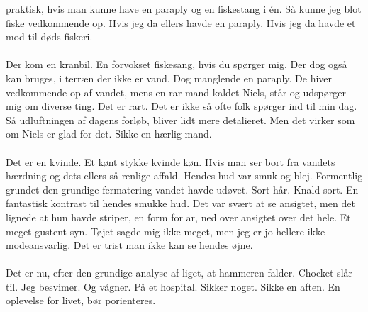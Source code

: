 \documentclass[]{article}
\begin{document}
praktisk, hvis man kunne have en paraply og en fiskestang i én. Så kunne jeg
blot fiske vedkommende op. Hvis jeg da ellers havde en paraply. Hvis jeg da
havde et mod til døds fiskeri.
\\
\\
Der kom en kranbil. En forvokset fiskesang, hvis du spørger mig. Der dog også
kan bruges, i terræn der ikke er vand. Dog manglende en paraply. De hiver
vedkommende op af vandet, mens en rar mand kaldet Niels, står og udspørger mig om diverse ting. Det er rart. Det er ikke så ofte folk spørger ind til min dag.
Så udluftningen af dagens forløb, bliver lidt mere detalieret. Men det virker som
om Niels er glad for det. Sikke en hærlig mand.
\\
\\
Det er en kvinde. Et kønt stykke kvinde køn. Hvis man ser bort fra vandets hærdning og dets ellers så renlige affald. Hendes hud var smuk og blej.
Formentlig grundet den grundige fermatering vandet havde udøvet. Sort hår.
Knald sort. En fantastisk kontrast til hendes smukke hud. Det var svært at se
ansigtet, men det lignede at hun havde striper, en form for ar, ned over ansigtet
over det hele. Et meget gustent syn. Tøjet sagde mig ikke meget, men jeg er jo
hellere ikke modeansvarlig. Det er trist man ikke kan se hendes øjne.
\\
\\
Det er nu, efter den grundige analyse af liget, at hammeren falder. Chocket
slår til. Jeg besvimer. Og vågner. På et hospital. Sikker noget. Sikke en aften.
En oplevelse for livet, bør porienteres.
\end{document}

